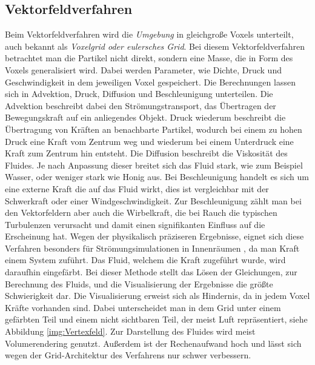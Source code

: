 \documentclass[intern,palatino]{cgBA}
\begin{document}
\subsection{Vektorfeldverfahren}\label{vektor}
Beim Vektorfeldverfahren wird die \textit{Umgebung} in gleichgroße Voxels unterteilt, auch bekannt als \textit{Voxelgrid oder eulersches Grid}. Bei diesem Vektorfeldverfahren betrachtet man die Partikel nicht direkt, sondern eine Masse, die in Form des Voxels generalisiert wird. Dabei werden Parameter, wie Dichte, Druck und Geschwindigkeit in dem jeweiligen Voxel gespeichert. Die Berechnungen lassen sich in Advektion, Druck, Diffusion und Beschleunigung unterteilen. Die Advektion beschreibt dabei den Strömungstransport, das Übertragen der Bewegungskraft auf ein anliegendes Objekt. Druck wiederum beschreibt die Übertragung von Kräften an benachbarte Partikel, wodurch bei einem zu hohen Druck eine Kraft vom Zentrum weg und wiederum bei einem Unterdruck eine Kraft zum Zentrum hin entsteht. Die Diffusion beschreibt die Viskosität des Fluides. Je nach Anpassung dieser breitet sich das Fluid stark, wie zum Beispiel Wasser, oder weniger stark wie Honig aus.
Bei Beschleunigung handelt es sich um eine externe Kraft die auf das Fluid wirkt, dies ist vergleichbar mit der Schwerkraft oder einer Windgeschwindigkeit. Zur Beschleunigung zählt man bei den Vektorfeldern aber auch die Wirbelkraft, die bei Rauch die typischen Turbulenzen verursacht und damit einen signifikanten Einfluss auf die Erscheinung hat.
\newline
Wegen der physikalisch präziseren Ergebnisse, eignet sich diese Verfahren besonders für Strömungsimulationen in Innenräumen \cite{franz}, da man Kraft einem System zuführt. Das Fluid, welchem die Kraft zugeführt wurde, wird daraufhin eingefärbt.
\newline
Bei dieser Methode stellt das Lösen der Gleichungen, zur Berechnung des Fluids, und die Visualisierung der Ergebnisse die größte Schwierigkeit dar. Die Visualisierung erweist sich als Hindernis, da in jedem Voxel Kräfte vorhanden sind. Dabei unterscheidet man in dem Grid unter einem gefärbten Teil und einem nicht sichtbaren Teil, der meist Luft repräsentiert, siehe Abbildung \ref{img:Vertexfeld}. Zur Darstellung des Fluides wird meist Volumerendering genutzt. Außerdem ist der Rechenaufwand hoch und lässt sich wegen der Grid-Architektur des Verfahrens nur schwer verbessern.
\end{document}
